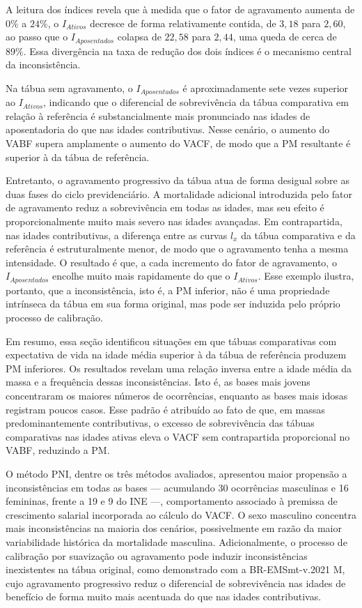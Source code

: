 A leitura dos índices revela que à medida que o fator de agravamento aumenta de $0\%$ a $24\%$, o $I_{Ativos}$ decresce de forma relativamente contida, de $3,18$ para $2,60$, ao passo que o $I_{Aposentados}$ colapsa de $22,58$ para $2,44$, uma queda de cerca de $89\%$. Essa divergência na taxa de redução dos dois índices é o mecanismo central da inconsistência.

Na tábua sem agravamento, o $I_{Aposentados}$ é aproximadamente sete vezes superior ao $I_{Ativos}$, indicando que o diferencial de sobrevivência da tábua comparativa em relação à referência é substancialmente mais pronunciado nas idades de aposentadoria do que nas idades contributivas. Nesse cenário, o aumento do VABF supera amplamente o aumento do VACF, de modo que a PM resultante é superior à da tábua de referência.

Entretanto, o agravamento progressivo da tábua atua de forma desigual sobre as duas fases do ciclo previdenciário. A mortalidade adicional introduzida pelo fator de agravamento reduz a sobrevivência em todas as idades, mas seu efeito é proporcionalmente muito mais severo nas idades avançadas. Em contrapartida, nas idades contributivas, a diferença entre as curvas $l_x$ da tábua comparativa e da referência é estruturalmente menor, de modo que o agravamento tenha a mesma intensidade. O resultado é que, a cada incremento do fator de agravamento, o $I_{Aposentados}$ encolhe muito mais rapidamente do que o $I_{Ativos}$. Esse exemplo ilustra, portanto, que a inconsistência, isto é, a PM inferior, não é uma propriedade intrínseca da tábua em sua forma original, mas pode ser induzida pelo próprio processo de calibração.

Em resumo, essa seção identificou situações em que tábuas comparativas com expectativa de vida na idade média superior à da tábua de referência produzem PM inferiores. Os resultados revelam uma relação inversa entre a idade média da massa e a frequência dessas inconsistências. Isto é, as bases mais jovens concentraram os maiores números de ocorrências, enquanto as bases mais idosas registram poucos casos. Esse padrão é atribuído ao fato de que, em massas predominantemente contributivas, o excesso de sobrevivência das tábuas comparativas nas idades ativas eleva o VACF sem contrapartida proporcional no VABF, reduzindo a PM.

O método PNI, dentre os três métodos avaliados, apresentou maior propensão a inconsistências em todas as bases — acumulando 30 ocorrências masculinas e 16 femininas, frente a 19 e 9 do INE —, comportamento associado à premissa de crescimento salarial incorporada ao cálculo do VACF. O sexo masculino concentra mais inconsistências na maioria dos cenários, possivelmente em razão da maior variabilidade histórica da mortalidade masculina. Adicionalmente, o processo de calibração por suavização ou agravamento pode induzir inconsistências inexistentes na tábua original, como demonstrado com a BR-EMSmt-v.2021 M, cujo agravamento progressivo reduz o diferencial de sobrevivência nas idades de benefício de forma muito mais acentuada do que nas idades contributivas.

